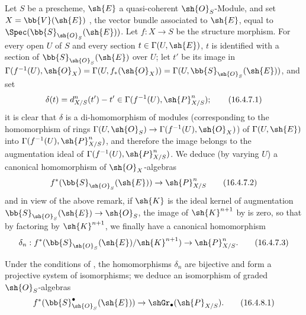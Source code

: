 \begin{env}[16.4.7]
\label{IV.16.4.7}
Let $S$ be a prescheme, $\sh{E}$ a quasi-coherent $\sh{O}_S$-Module, and set $X = \bb{V}(\sh{E})$ , the vector bundle associated to $\sh{E}$, equal to $\Spec(\bb{S}_{\sh{O}_S}(\sh{E}))$.
Let $f:X \to S$ be the structure morphism.
For every open $U$ of $S$ and every section $t \in \Gamma(U, \sh{E})$, $t$ is identified with a section of $\bb{S}_{\sh{O}_S}(\sh{E})$ over $U$;
let $t'$ be its image in $\Gamma(f^{-1}(U), \sh{O}_X) = \Gamma(U, f_*(\sh{O}_X)) = \Gamma(U, \bb{S}_{\sh{O}_S}(\sh{E}))$, and set
\[
  \label{IV.16.4.7.1}
  \delta(t) = d_{X/S}^n(t') - t' \in \Gamma(f^{-1}(U), \sh{P}_{X/S}^n);
  \tag{16.4.7.1}
\]
it is clear that $\delta$ is a di-homomorphism of modules (corresponding to the homomorphism of rings $\Gamma(U, \sh{O}_S) \to \Gamma(f^{-1}(U), \sh{O}_X)$) of $\Gamma(U, \sh{E})$ into $\Gamma(f^{-1}(U), \sh{P}_{X/S}^n)$, and therefore the image belongs to the augmentation ideal of $\Gamma(f^{-1}(U), \sh{P}_{X/S}^n)$.
We deduce (by varying $U$) a canonical homomorphism of $\sh{O}_X$-algebras
\[
  \label{IV.16.4.7.2}
  f^*(\bb{S}_{\sh{O}_S}(\sh{E})) \to \sh{P}_{X/S}^n
  \tag{16.4.7.2}
\]
and in view of the above remark, if $\sh{K}$ is the ideal kernel of augmentation $\bb{S}_{\sh{O}_S}(\sh{E}) \to \sh{O}_S$, the image of $\sh{K}^{n+1}$ by  is zero, so that by factoring by $\sh{K}^{n+1}$, we finally have a canonical homomorphism
\[
  \label{IV.16.4.7.3}
  \delta_n: f^*(\bb{S}_{\sh{O}_S}(\sh{E})/\sh{K}^{n+1}) \to \sh{P}_{X/S}^n.
  \tag{16.4.7.3}
\]
\end{env} 

\begin{proposition}[16.4.8]
\label{IV.16.4.8}
Under the conditions of , the homomorphisms $\delta_n$ are bijective and form a projective system of isomorphisms;
we deduce an isomorphism of graded $\sh{O}_S$-algebras 
\[
  \label{IV.16.4.8.1}
  f^*(\bb{S}_{\sh{O}_S}^\bullet(\sh{E})) \to \shGr_\bullet(\sh{P}_{X/S}).
  \tag{16.4.8.1}
\]
\end{proposition}

